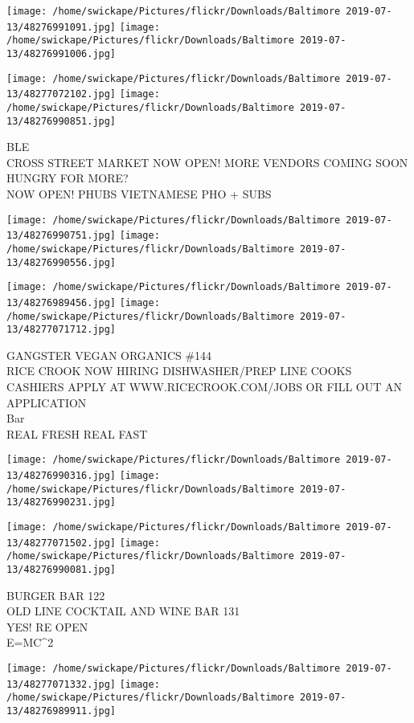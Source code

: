 \documentclass[10pt,letterpaper]{article}
\begin{document}
\texttt{[image: /home/swickape/Pictures/flickr/Downloads/Baltimore 2019-07-13/48276991091.jpg]}
\texttt{[image: /home/swickape/Pictures/flickr/Downloads/Baltimore 2019-07-13/48276991006.jpg]}

\texttt{[image: /home/swickape/Pictures/flickr/Downloads/Baltimore 2019-07-13/48277072102.jpg]}
\texttt{[image: /home/swickape/Pictures/flickr/Downloads/Baltimore 2019-07-13/48276990851.jpg]}

BLE\\
CROSS STREET MARKET NOW OPEN!  MORE VENDORS COMING SOON\\
HUNGRY FOR MORE?\\
NOW OPEN!  PHUBS VIETNAMESE PHO + SUBS
\pagebreak

\texttt{[image: /home/swickape/Pictures/flickr/Downloads/Baltimore 2019-07-13/48276990751.jpg]}
\texttt{[image: /home/swickape/Pictures/flickr/Downloads/Baltimore 2019-07-13/48276990556.jpg]}

\texttt{[image: /home/swickape/Pictures/flickr/Downloads/Baltimore 2019-07-13/48276989456.jpg]}
\texttt{[image: /home/swickape/Pictures/flickr/Downloads/Baltimore 2019-07-13/48277071712.jpg]}

GANGSTER VEGAN ORGANICS \#144\\
RICE CROOK NOW HIRING DISHWASHER/PREP LINE COOKS CASHIERS APPLY AT WWW.RICECROOK.COM/JOBS OR FILL OUT AN APPLICATION\\
Bar\\
REAL FRESH REAL FAST
\pagebreak

\texttt{[image: /home/swickape/Pictures/flickr/Downloads/Baltimore 2019-07-13/48276990316.jpg]}
\texttt{[image: /home/swickape/Pictures/flickr/Downloads/Baltimore 2019-07-13/48276990231.jpg]}

\texttt{[image: /home/swickape/Pictures/flickr/Downloads/Baltimore 2019-07-13/48277071502.jpg]}
\texttt{[image: /home/swickape/Pictures/flickr/Downloads/Baltimore 2019-07-13/48276990081.jpg]}

BURGER BAR 122\\
OLD LINE COCKTAIL AND WINE BAR 131\\
YES!  RE OPEN\\
E=MC\^{}2
\pagebreak

\texttt{[image: /home/swickape/Pictures/flickr/Downloads/Baltimore 2019-07-13/48277071332.jpg]}
\texttt{[image: /home/swickape/Pictures/flickr/Downloads/Baltimore 2019-07-13/48276989911.jpg]}
\end{document}
